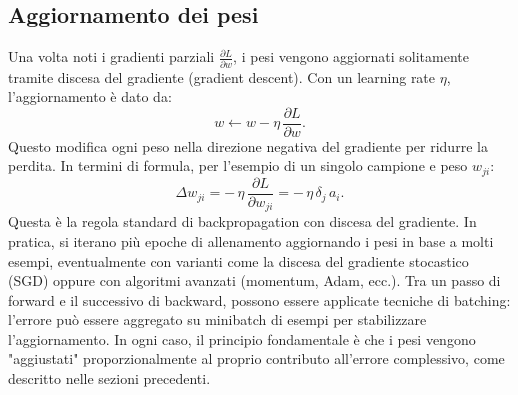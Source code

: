 \documentclass[a4paper,12pt]{report}
\begin{document}
	\subsection{Aggiornamento dei pesi}
	Una volta noti i gradienti parziali \(\frac{\partial L}{\partial w}\), i pesi vengono aggiornati solitamente tramite discesa del gradiente (gradient descent). Con un learning rate \(\eta\), l'aggiornamento è dato da:
	\[
	w \leftarrow w - \eta\,\frac{\partial L}{\partial w}.
	\]
	Questo modifica ogni peso nella direzione negativa del gradiente per ridurre la perdita. In termini di formula, per l'esempio di un singolo campione e peso \(w_{ji}\):
	\[
	\Delta w_{ji} = -\,\eta\,\frac{\partial L}{\partial w_{ji}} = -\,\eta\,\delta_j\,a_i.
	\]
	Questa è la regola standard di backpropagation con discesa del gradiente. In pratica, si iterano più epoche di allenamento aggiornando i pesi in base a molti esempi, eventualmente con varianti come la discesa del gradiente stocastico (SGD) oppure con algoritmi avanzati (momentum, Adam, ecc.). Tra un passo di forward e il successivo di backward, possono essere applicate tecniche di batching: l'errore può essere aggregato su minibatch di esempi per stabilizzare l'aggiornamento. In ogni caso, il principio fondamentale è che i pesi vengono "aggiustati" proporzionalmente al proprio contributo all'errore complessivo, come descritto nelle sezioni precedenti.
	
\end{document}
